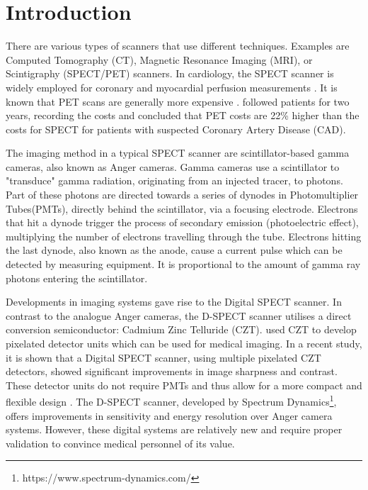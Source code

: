 \chapter{Introduction}
\label{ch:Intro}


There are various types of scanners that use different techniques. Examples are Computed Tomography (CT), Magnetic Resonance Imaging (MRI), or Scintigraphy (SPECT/PET) scanners. In cardiology, the SPECT scanner is widely employed for coronary and myocardial perfusion measurements \citep{rahmim2008pet}. It is known that PET scans are generally more expensive \citep{hlatky2014economic, RadioPead2018}. \cite{hlatky2014economic} followed patients for two years, recording the costs and concluded that PET costs are 22\% higher than the costs for SPECT for patients with suspected Coronary Artery Disease (CAD).

The imaging method in a typical SPECT scanner are scintillator-based gamma cameras, also known as Anger cameras. Gamma cameras use a scintillator to "transduce" gamma radiation, originating from an injected tracer, to photons. Part of these photons are directed towards a series of dynodes in Photomultiplier Tubes(PMTs), directly behind the scintillator, via a focusing electrode. Electrons that hit a dynode trigger the process of secondary emission (photoelectric effect), multiplying the number of electrons travelling through the tube. Electrons hitting the last dynode, also known as the anode, cause a current pulse which can be detected by measuring equipment. It is proportional to the amount of gamma ray photons entering the scintillator\citep{CZTTech2009}.

Developments in imaging systems gave rise to the Digital SPECT scanner. In contrast to the analogue Anger cameras, the D-SPECT scanner utilises a direct conversion semiconductor: Cadmium Zinc Telluride (CZT). \cite{wagenaar2004cdte} used CZT to develop pixelated detector units which can be used for medical imaging. In a recent study, it is shown that a Digital SPECT scanner, using multiple pixelated CZT detectors, showed significant improvements in image sharpness and contrast\citep{goshen2018feasibility}. These detector units do not require PMTs and thus allow for a more compact and flexible design \citep{erlandsson2009performance}. The D-SPECT scanner, developed by Spectrum Dynamics\footnote{https://www.spectrum-dynamics.com/}, offers improvements in sensitivity and energy resolution \citep{SpectDynam2018} over Anger camera systems. However, these digital systems are relatively new and require proper validation to convince medical personnel of its value.

